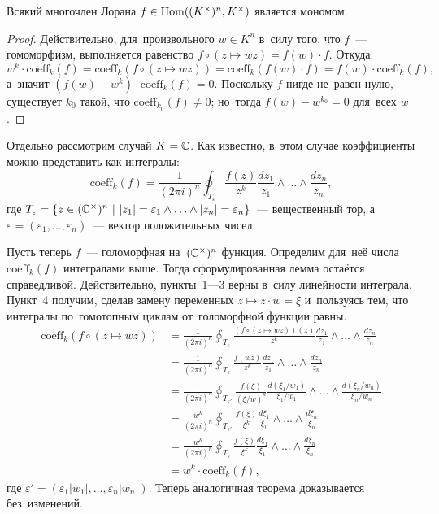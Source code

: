 \documentclass[a4paper,oneside]{article}
\begin{document}
\begin{theorem*}
    Всякий многочлен Лорана $f \in \mathrm{Hom}((K^\times)^n, K^\times)$ является мономом.
\end{theorem*}

\begin{proof}
    Действительно, для~произвольного $w \in K^n$ в~силу того, что $f$~— гомоморфизм,
    выполняется равенство $f \circ (z \mapsto wz) = f(w) \cdot f$. Откуда:
    $$
        w^k \cdot \mathrm{coeff}_k(f) = \mathrm{coeff}_k(f \circ (z \mapsto wz)) = \mathrm{coeff}_k(f(w) \cdot f) = f(w) \cdot \mathrm{coeff}_k(f),
    $$
    а~значит $(f(w) - w^k) \cdot \mathrm{coeff}_k(f) = 0$.
    Поскольку $f$ нигде не~равен нулю, существует $k_0$ такой, что $\mathrm{coeff}_{k_0}(f) \neq 0$;
    но~тогда $f(w) - w^{k_0} = 0$ для~всех $w$.
\end{proof}

Отдельно рассмотрим случай $K = \mathbb{C}$. Как известно, в~этом случае коэффициенты можно представить как интегралы:
$$
    \mathrm{coeff}_k(f) = \frac{1}{(2 \pi i)^n} \oint_{T_\varepsilon} \frac{f(z)}{z^k} \frac{dz_1}{z_1} \wedge \ldots \wedge \frac{dz_n}{z_n},
$$
где $T_\varepsilon = \{ z \in (\torus)^n\ |\ |z_1| = \varepsilon_1 \wedge \ldots \wedge |z_n| = \varepsilon_n \}$~— вещественный тор,
а~$\varepsilon = (\varepsilon_1, \ldots, \varepsilon_n)$~— вектор положительных чисел.

Пусть теперь $f$~— голоморфная на~$(\mathbb{C}^\times)^n$ функция. Определим для~неё числа $\mathrm{coeff}_k(f)$ интегралами выше.
Тогда сформулированная лемма остаётся справедливой. Действительно, пункты~1—3 верны в~силу линейности интеграла.
Пункт~4 получим, сделав замену переменных $z \mapsto z \cdot w = \xi$ и~пользуясь тем, что интегралы
по~гомотопным циклам от~голоморфной функции равны.
\begin{align*}
    \mathrm{coeff}_k(f \circ (z \mapsto wz)) &= \frac{1}{(2 \pi i)^n} \oint_{T_\varepsilon} \frac{(f \circ (z \mapsto wz))(z)}{z^k} \frac{dz_1}{z_1} \wedge \ldots \wedge \frac{dz_n}{z_n} \\
                                             &= \frac{1}{(2 \pi i)^n} \oint_{T_\varepsilon} \frac{f(wz)}{z^k} \frac{dz_1}{z_1} \wedge \ldots \wedge \frac{dz_n}{z_n} \\
                                             &= \frac{1}{(2 \pi i)^n} \oint_{T_{\varepsilon'}} \frac{f(\xi)}{(\xi / w)^k} \frac{d(\xi_1 / w_1)}{\xi_1 / w_1} \wedge \ldots \wedge \frac{d(\xi_n / w_n)}{\xi_n / w_n} \\
                                             &= \frac{w^k}{(2 \pi i)^n} \oint_{T_{\varepsilon'}} \frac{f(\xi)}{\xi^k} \frac{d\xi_1}{\xi_1} \wedge \ldots \wedge \frac{d\xi_n}{\xi_n} \\
                                             &= \frac{w^k}{(2 \pi i)^n} \oint_{T_{\varepsilon}} \frac{f(\xi)}{\xi^k} \frac{d\xi_1}{\xi_1} \wedge \ldots \wedge \frac{d\xi_n}{\xi_n} \\
                                             &= w^k \cdot \mathrm{coeff}_k(f),
\end{align*}
где $\varepsilon' = (\varepsilon_1 |w_1|, \ldots, \varepsilon_n |w_n|)$.
Теперь аналогичная теорема доказывается без~изменений.
\end{document}
